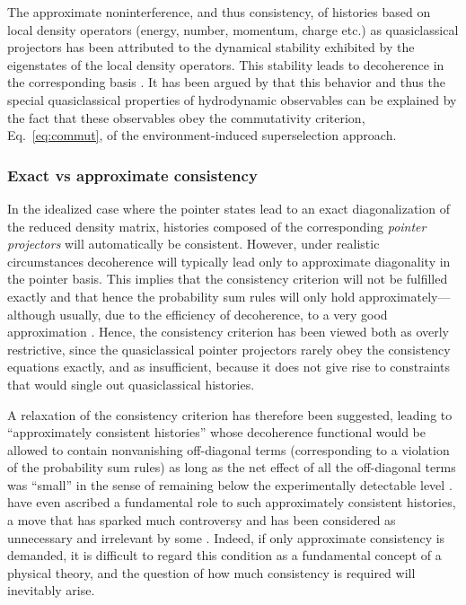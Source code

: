 \documentclass[rmp,aps,amsmath,amsfonts,noshowkeys,noshowpacs,12pt]{revtex4}
\begin{document}
The approximate noninterference, and thus consistency, of histories
based on local density operators (energy, number, momentum, charge
etc.) as quasiclassical projectors \citep[the so-called {\em
  hydrodynamic observables},
see][]{GellMann:1991:pp,Dowker:1992:vz,Halliwell:1998:fg} has been
attributed to the dynamical stability exhibited by the eigenstates of
the local density operators. This stability leads to decoherence in
the corresponding basis \citep{Halliwell:1998:fg,Halliwell:1999:ii}.
It has been argued by \citet{Zurek:2002:ii} that this behavior and
thus the special quasiclassical properties of hydrodynamic observables
can be explained by the fact that these observables obey the
commutativity criterion, Eq.~\eqref{eq:commut}, of the
environment-induced superselection approach.


\subsubsection{Exact vs approximate consistency}

In the idealized case where the pointer states lead to an exact
diagonalization of the reduced density matrix, histories composed of
the corresponding {\em pointer projectors} will automatically be
consistent. However, under realistic circumstances decoherence will
typically lead only to approximate diagonality in the pointer basis.
This implies that the consistency criterion will not be fulfilled
exactly and that hence the probability sum rules will only hold
approximately---although usually, due to the efficiency of
decoherence, to a very good approximation
\citep{Griffiths:1984:tr,GellMann:1991:pp,Omnes:1992:gy,%
Omnes:1994:pz,Albrecht:1992:rz,Albrecht:1993:pq,Zurek:1993:pu,%
Paz:1993:ww,Twamley:1993:bz}.  Hence, the consistency
criterion has been viewed both as overly restrictive, since the
quasiclassical pointer projectors rarely obey the consistency
equations exactly, and as insufficient, because it does not give rise
to constraints that would single out quasiclassical histories.

A relaxation of the consistency criterion has therefore been
suggested, leading to ``approximately consistent histories'' whose
decoherence functional would be allowed to contain nonvanishing
off-diagonal terms (corresponding to a violation of the probability
sum rules) as long as the net effect of all the off-diagonal terms was
``small'' in the sense of remaining below the experimentally
detectable level \citep[see, for
example,][]{GellMann:1991:pp,Dowker:1992:vz}.
\citet{GellMann:1991:pp} have even ascribed a fundamental role to such
approximately consistent histories, a move that has sparked much
controversy and has been considered as unnecessary and irrelevant by
some \citep{Dowker:1995:pa,Dowker:1996:ch}. Indeed, if only
approximate consistency is demanded, it is difficult to regard this
condition as a fundamental concept of a physical theory, and the
question of how much consistency is required will inevitably arise.
\end{document}
